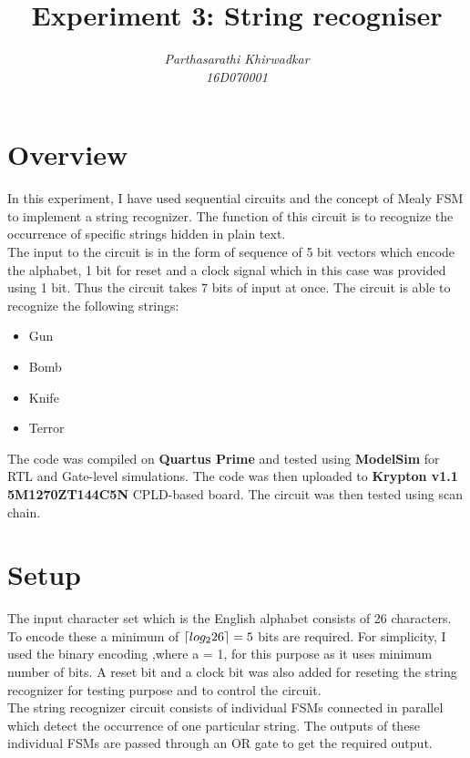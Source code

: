 \documentclass[12pt]{article}
\title{Experiment 3: String recogniser}
\author{\textit{Parthasarathi Khirwadkar}\\\textit{16D070001}}
\DeclarePairedDelimiter{\ceil}{\lceil}{\rceil}
\begin{document}
\maketitle

\section*{Overview}
In this experiment, I have used sequential circuits and the concept of Mealy FSM to implement a string recognizer. The function of this circuit is to recognize the occurrence of specific strings hidden in plain text.\\
The input to the circuit is in the form of sequence of 5 bit vectors which encode the alphabet, 1 bit for reset and a clock signal which in this case was provided using 1 bit. Thus the circuit takes 7 bits of input at once. The circuit is able to recognize the following strings:
\begin{itemize}
\item Gun
\item Bomb
\item Knife
\item Terror
\end{itemize}

The code was compiled on \textbf{Quartus Prime} and tested using \textbf{ModelSim} for RTL and Gate-level simulations. The code was then uploaded to \textbf{Krypton v1.1 5M1270ZT144C5N} CPLD-based board. The circuit was then tested using scan chain.



\section{Setup}
The input character set which is the English alphabet consists of 26 characters. To encode these a minimum of $\ceil{log_2 26} = 5$ bits are required. For simplicity, I used the binary encoding ,where a = 1, for this purpose as it uses minimum number of bits. A reset bit and a clock bit was also added for reseting the string recognizer for testing purpose and to control the circuit.\\
The string recognizer circuit consists of individual FSMs connected in parallel which detect the occurrence of one particular string. The outputs of these individual FSMs are passed through an OR gate to get the required output.\\
\end{document}
